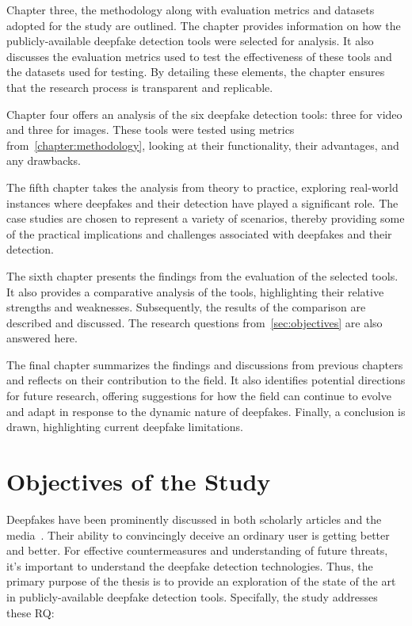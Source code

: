 Chapter three, the methodology along with evaluation metrics and datasets
adopted for the study are outlined. The chapter provides information on how
the publicly-available deepfake detection tools were selected for analysis.
It also discusses the evaluation metrics used to test the effectiveness of these
tools and the datasets used for testing. By detailing these elements, the chapter
ensures that the research process is transparent and replicable.

Chapter four offers an analysis of the six deepfake detection tools: three for video
and three for images. These tools were tested using metrics from~\autoref{chapter:methodology},
looking at their functionality, their advantages, and any drawbacks.

The fifth chapter takes the analysis from theory to practice, exploring real-world instances
where deepfakes and their detection have played a significant role. The case studies
are chosen to represent a variety of scenarios, thereby providing some of the
practical implications and challenges associated with deepfakes and their
detection.

The sixth chapter presents the findings from the evaluation of the selected tools.
It also provides a comparative analysis of the tools, highlighting their relative
strengths and weaknesses. Subsequently, the results of the comparison are described
and discussed. The research questions from~\autoref{sec:objectives} are also answered here.

The final chapter summarizes the findings and discussions from previous chapters and
reflects on their contribution to the field. It also identifies potential directions
for future research, offering suggestions for how the field can continue to evolve
and adapt in response to the dynamic nature of deepfakes. Finally, a conclusion is drawn,
highlighting current deepfake limitations.

\section{Objectives of the Study}\label{sec:objectives}
Deepfakes have been prominently discussed in both scholarly articles and the media~\cite{forbes-2020,guardian-2019}.
Their ability to convincingly deceive an ordinary user is getting better and better.
For effective countermeasures and understanding of future threats, it's important to understand
the deepfake detection technologies. Thus, the primary purpose of the thesis is to provide
an exploration of the state of the art in publicly-available deepfake detection tools.
Specifally, the study addresses these \ac{RQ}:

